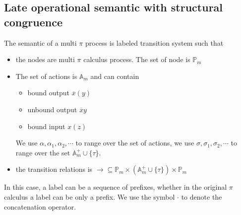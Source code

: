 \subsection{Late operational semantic with structural congruence}

The semantic of a multi $\pi$ process is labeled transition system such that
\begin{itemize}
  \item 
    the nodes are multi $\pi$ calculus process. The set of node is $\mathbb{P}_{m}$
  \item
    The set of actions is $\mathbb{A}_{m}$ and can contain
    \begin{itemize}
      \item 
	bound output $\overline{x}(y)$
      \item
	unbound output $\overline{x}y$ 
      \item
	bound input $x(z)$
    \end{itemize}
    We use $\alpha, \alpha_{1}, \alpha_{2},\cdots $ to range over the set of actions, we use $\sigma, \sigma_{1}, \sigma_{2}, \cdots $ to range over the set $\mathbb{A}_{m}^{+} \cup \{\tau\}$. 
  \item
    the transition relations is $\rightarrow\subseteq \mathbb{P}_{m}\times (\mathbb{A}_{m}^{+} \cup \{\tau\})\times \mathbb{P}_{m}$
\end{itemize}

In this case, a label can be a sequence of prefixes, whether in the original $\pi$ calculus a label can be only a prefix. We use the symbol $\cdot$ to denote the concatenation operator.

